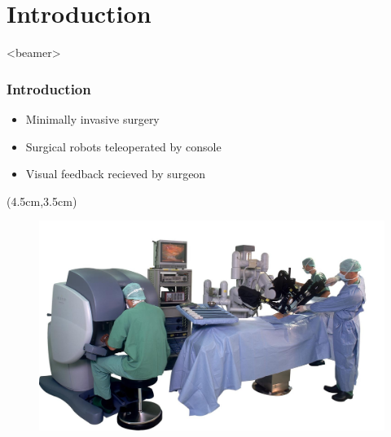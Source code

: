 \section{Introduction}
\begin{frame}<beamer>
\frametitle{Introduction}
\begin{itemize}
\item Minimally invasive surgery 
\item Surgical robots teleoperated by console

\item Visual feedback recieved by surgeon
\end{itemize}

\begin{textblock*}{0.7\textwidth}(4.5cm,3.5cm) %
	\begin{figure}[H]
		\centering
		\centering
		\includegraphics[width=1\textwidth]{Billeder/Dan/davinci.jpg}
	\end{figure}
\end{textblock*}

\end{frame}

